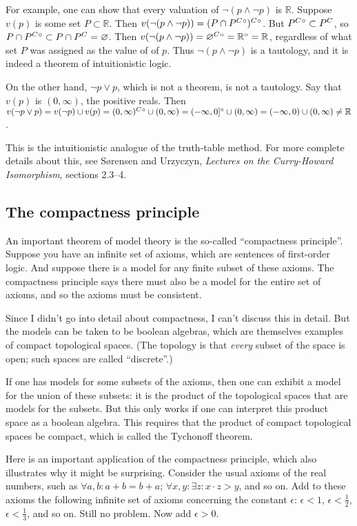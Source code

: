 \documentclass{article}
\def\R{{\mathbb R}}
\def\comp#1{\smash{#1}^C\vphantom{#1}}
\def\inter#1{\smash{#1}^\circ\vphantom{#1}}
\def\intercomp#1{\inter{\comp{#1}}}
\begin{document}
For example, one can show that every valuation of $\neg(p\wedge\neg
p)$ is $\R$.  Suppose $v(p)$ is some set $P\subset\R$.  Then
$v(\neg(p\wedge\neg p)) = \intercomp{(P\cap\intercomp P)}$.  But
$\intercomp P \subset \comp P$, so $P\cap\intercomp P \subset
P\cap\comp P = \varnothing$.  Then $v(\neg(p\wedge\neg p)) =
\intercomp\varnothing = \inter\R = \R$, regardless of what set $P$ was
assigned as the value of of $p$.  Thus $\neg(p\wedge\neg p)$ is a
tautology, and it is indeed a theorem of intuitionistic logic.

On the other hand, $\neg p\vee p$, which is not a theorem, is not a tautology.
Say that $v(p)$ is $(0, \infty)$, the positive reals.  Then $v(\neg p\vee p)
= v(\neg p) \cup v(p)
= \intercomp{(0, \infty)} \cup (0, \infty)
= \inter{(-\infty, 0]}    \cup (0, \infty) 
= (-\infty, 0)            \cup (0, \infty)
\ne\R$.

This is the intuitionistic analogue of the truth-table method. For
more complete details about this, see S\o rensen and Urzyczyn,
{\em Lectures on the Curry-Howard Isomorphism\/}, sections 2.3--4.

\subsection*{The compactness principle}

An important theorem of model theory is the so-called ``compactness
principle''.  Suppose you have an infinite set of axioms,
which are sentences of first-order logic.  And suppose there is a
model for any finite subset of these axioms.  The compactness
principle says there must also be a model for the entire set of
axioms, and so the axioms must be consistent.

Since I didn't go into detail about compactness, I can't discuss this
in detail.  But the models can be taken to be boolean algebras, which
are themselves examples of compact topological spaces.  (The topology
is that {\em every\/} subset of the space is open; such spaces are
called ``discrete''.)

If one has models for some subsets of the axioms, then one can exhibit
a model for the union of these subsets: it is the product of the
topological spaces that are models for the subsets.  But this only
works if one can interpret this product space as a boolean algebra.
This requires that the product of compact topological spaces be
compact, which is called the Tychonoff theorem.

Here is an important application of the compactness principle, which
also illustrates why it might be surprising.  Consider the usual
axioms of the real numbers, such as $\forall a,b : a+b = b+a$;
$\forall x,y : \exists z : x\cdot z > y$, and so on.  Add to these
axioms the following infinite set of axioms concerning the constant
$\epsilon$: $\epsilon < 1$, $\epsilon < \frac12$, $\epsilon <
\frac13$, and so on. Still no problem.  Now add $\epsilon > 0$.
\end{document}

